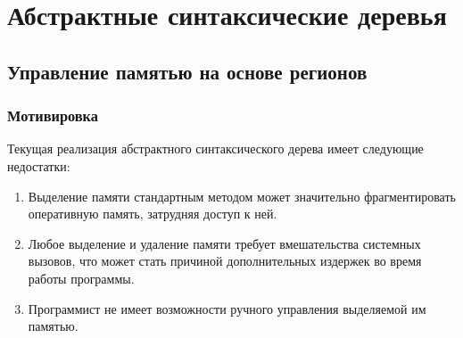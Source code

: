 \documentclass[bachelor, och, otchet]{SCWorks}
\begin{document}









\section{Абстрактные синтаксические деревья}
\subsection{Управление памятью на основе регионов}
\subsubsection{Мотивировка}

Текущая реализация абстрактного синтаксического дерева имеет следующие
недостатки: 

\begin{enumerate}
    \item Выделение памяти стандартным методом может значительно фрагментировать
    оперативную память, затрудняя доступ к ней. 
    \item Любое выделение и удаление памяти требует вмешательства системных
    вызовов, что может стать причиной дополнительных издержек во время работы
    программы.
    \item Программист не имеет возможности ручного управления выделяемой им
    памятью.
\end{enumerate} 
\end{document}
